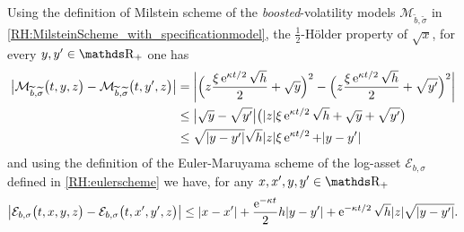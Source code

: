 Using the definition of Milstein scheme of the \textit{boosted}-volatility models $\mathcal{M}_{\widetilde b, \widetilde \sigma}$ in \eqref{RH:MilsteinScheme_with_specificationmodel}, the $\frac{1}{2}$-Hölder property of $\sqrt{x}$, for every $y,y' \in \R_+$ one has
\begin{equation}
	\begin{aligned}
		\big\vert \mathcal{M}_{\widetilde b, \widetilde \sigma} \big( t, y, z \big) - \mathcal{M}_{\widetilde b, \widetilde \sigma} \big( t, y', z \big) \big\vert
		 & = \bigg\vert \Big( z \frac{ \xi \operatorname{e}^{\kappa t / 2} \sqrt{h} }{2} + \sqrt{y} \Big)^2 - \Big( z \frac{ \xi \operatorname{e}^{\kappa t / 2} \sqrt{h} }{2} + \sqrt{y'} \Big)^2 \bigg\vert \\
		 & \leq \big\vert \sqrt{y} - \sqrt{y'} \big\vert \big( \vert z \vert \xi \operatorname{e}^{\kappa t / 2} \sqrt{h} + \sqrt{y} + \sqrt{y'} \big)                                          \\
		 & \leq \sqrt{ \vert y - y' \vert} \sqrt{h} \vert z \vert \xi \operatorname{e}^{\kappa t / 2}  + \vert y - y' \vert
	\end{aligned}
\end{equation}
and using the definition of the Euler-Maruyama scheme of the log-asset $\mathcal{E}_{b, \sigma}$ defined in \eqref{RH:eulerscheme} we have, for any $x,x',y,y' \in \R_+$
\begin{equation}
	\begin{aligned}
		\big\vert \mathcal{E}_{b, \sigma} \big( t, x, y, z \big) - \mathcal{E}_{b, \sigma} \big( t, x', y', z \big) \big\vert \leq \vert x - x' \vert + \frac{\operatorname{e}^{- \kappa t}}{2} h \vert y - y' \vert + \operatorname{e}^{- \kappa t / 2} \sqrt{h} \vert z \vert \sqrt{ \vert y - y' \vert}.
	\end{aligned}
\end{equation}




